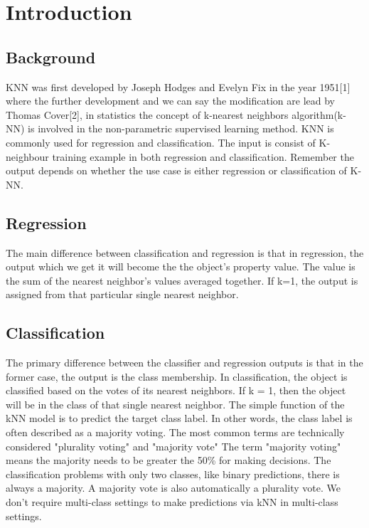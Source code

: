 \documentclass[conference]{IEEEtran}
\begin{document}
\IEEEpeerreviewmaketitle



\section{Introduction}

\subsection{Background}
KNN was first developed by Joseph Hodges and Evelyn Fix in the year 1951[1] where the further development and we can say the modification are lead by Thomas Cover[2], in statistics the concept of k-nearest neighbors algorithm(k-NN) is involved in the non-parametric supervised learning method. KNN is commonly used for regression and classification. The input is consist of K-neighbour training example in both regression and classification. Remember the output depends on whether the use case is either regression or classification of K-NN. 

\subsection{Regression}
The main difference between classification and regression is that in regression, the output which we get it will become the the object's property value. The value is the sum of the nearest neighbor's values averaged together. If k=1, the output is assigned from that particular single nearest neighbor. 

\subsection{Classification}
The primary difference between the classifier and regression outputs is that in the former case, the output is the class membership. In classification, the object is classified based on the votes of its nearest neighbors. If k = 1, then the object will be in the class of that single nearest neighbor. The simple function of the kNN model is to predict the target class label. In other words, the class label is often described as a majority voting. The most common terms are technically considered "plurality voting" and "majority vote" The term "majority voting" means the majority needs to be greater the 50\%  
for making decisions. The classification problems with only two classes, like binary predictions, there is always a majority. A majority vote is also automatically a plurality vote. We don't require multi-class settings to make predictions via kNN in multi-class settings. 
\end{document}
